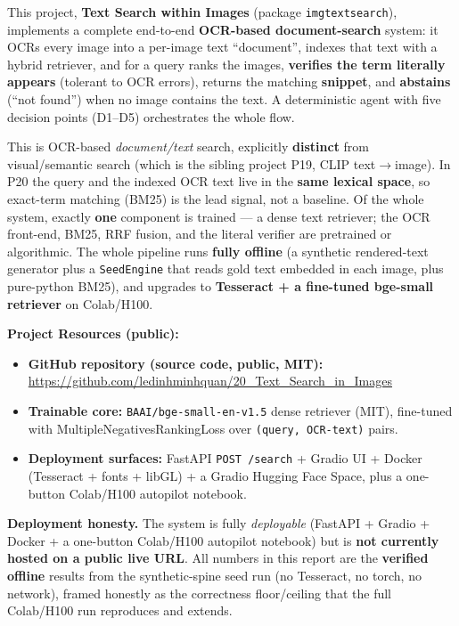 \documentclass[12pt,a4paper]{article}
\begin{document}
This project, \textbf{Text Search within Images} (package \texttt{imgtextsearch}), implements a complete end-to-end \textbf{OCR-based document-search} system: it OCRs every image into a per-image text ``document'', indexes that text with a hybrid retriever, and for a query ranks the images, \textbf{verifies the term literally appears} (tolerant to OCR errors), returns the matching \textbf{snippet}, and \textbf{abstains} (``not found'') when no image contains the text. A deterministic agent with five decision points (D1--D5) orchestrates the whole flow.

This is OCR-based \emph{document/text} search, explicitly \textbf{distinct} from visual/semantic search (which is the sibling project P19, CLIP text$\rightarrow$image). In P20 the query and the indexed OCR text live in the \textbf{same lexical space}, so exact-term matching (BM25) is the lead signal, not a baseline. Of the whole system, exactly \textbf{one} component is trained --- a dense text retriever; the OCR front-end, BM25, RRF fusion, and the literal verifier are pretrained or algorithmic. The whole pipeline runs \textbf{fully offline} (a synthetic rendered-text generator plus a \texttt{SeedEngine} that reads gold text embedded in each image, plus pure-python BM25), and upgrades to \textbf{Tesseract + a fine-tuned bge-small retriever} on Colab/H100.

\textbf{Project Resources (public):}
\begin{itemize}\setlength\itemsep{0.15em}
  \item \textbf{GitHub repository (source code, public, MIT):} \url{https://github.com/ledinhminhquan/20_Text_Search_in_Images}
  \item \textbf{Trainable core:} \texttt{BAAI/bge-small-en-v1.5} dense retriever (MIT), fine-tuned with MultipleNegativesRankingLoss over \texttt{(query, OCR-text)} pairs.
  \item \textbf{Deployment surfaces:} FastAPI \texttt{POST /search} + Gradio UI + Docker (Tesseract + fonts + libGL) + a Gradio Hugging Face Space, plus a one-button Colab/H100 autopilot notebook.
\end{itemize}

\noindent\textbf{Deployment honesty.} The system is fully \emph{deployable} (FastAPI + Gradio + Docker + a one-button Colab/H100 autopilot notebook) but is \textbf{not currently hosted on a public live URL}. All numbers in this report are the \textbf{verified offline} results from the synthetic-spine seed run (no Tesseract, no torch, no network), framed honestly as the correctness floor/ceiling that the full Colab/H100 run reproduces and extends.
\end{document}
